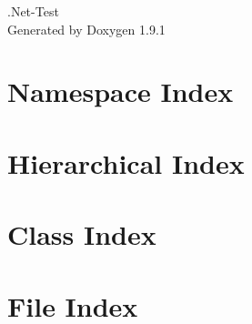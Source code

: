 \let\mypdfximage\pdfximage\def\pdfximage{\immediate\mypdfximage}\documentclass[twoside]{book}
\newcommand{\+}{\discretionary{\mbox{\scriptsize$\hookleftarrow$}}{}{}}
\newcommand{\clearemptydoublepage}{%
  \newpage{\pagestyle{empty}\cleardoublepage}%
}
\begin{document}
\raggedbottom

\hypersetup{pageanchor=false,
             bookmarksnumbered=true,
             pdfencoding=unicode
            }
\begin{titlepage}
\vspace*{7cm}
\begin{center}%
{\Large .Net-\/\+Test }\\
\vspace*{1cm}
{\large Generated by Doxygen 1.9.1}\\
\end{center}
\end{titlepage}
\clearemptydoublepage
{}
\tableofcontents
\clearemptydoublepage
{}
\hypersetup{pageanchor=true}

\chapter{Namespace Index}

\chapter{Hierarchical Index}

\chapter{Class Index}

\chapter{File Index}

\end{document}
